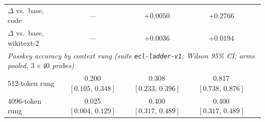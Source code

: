 \begin{table}[t]
\begin{tabular}{lcccc}
$\Delta$ vs.\ base, code       & --- & $+0.0050$ & $+0.2766$ & \\
$\Delta$ vs.\ base, wikitext-2 & --- & $+0.0036$ & $+0.0194$ & \\
\midrule
\multicolumn{5}{l}{\emph{Passkey accuracy by context rung (suite \texttt{ecl-ladder-v1}; Wilson 95\% CI; arms pooled, $3{\times}40$ probes)}} \\
512-token rung  & 0.200 $[0.105,\,0.348]$ & 0.308 $[0.233,\,0.396]$ & 0.817 $[0.738,\,0.876]$ & \\
4096-token rung & 0.025 $[0.004,\,0.129]$ & 0.400 $[0.317,\,0.489]$ & 0.400 $[0.317,\,0.489]$ & \\
\bottomrule
\end{tabular}
\end{table}
